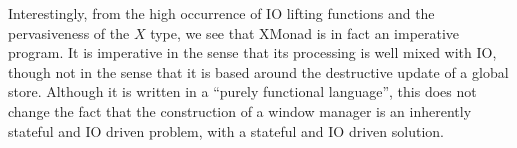 Interestingly, from the high occurrence of IO lifting functions and the pervasiveness of the $X$ type, we see that XMonad is in fact an imperative program.  It is imperative in the sense that its processing is well mixed with IO, though not in the sense that it is based around the destructive update of a global store. Although it is written in a ``purely functional language'', this does not change the fact that the construction of a window manager is an inherently stateful and IO driven problem, with a stateful and IO driven solution. 

